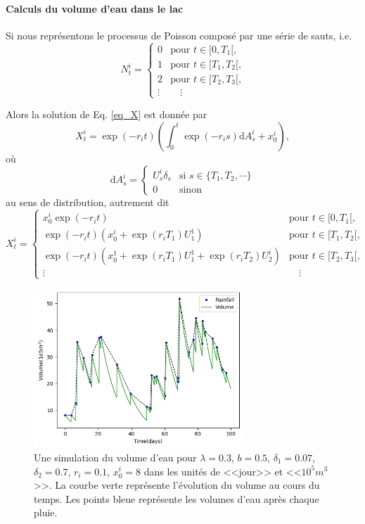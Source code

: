 \documentclass{article}
\def \dd {\mathrm{d}}
\begin{document}
\paragraph{Calculs du volume d'eau dans le lac} Si nous représentons le processus de Poisson composé par une série de sauts, i.e.
\[N_t^i = \begin{cases}0&\textrm{pour $t\in [0, T_1[$,}\\
  1&\textrm{pour $t\in [T_1, T_2[$,}\\
  2&\textrm{pour $t\in [T_2, T_3[$,}\\
  \vdots &\quad\vdots\end{cases}\]

Alors la solution de Eq. \ref{eq_X} est donnée par
\[X_t^i = \exp(-r_i t)\left(\int_0^t \exp(-r_i s)\dd A_s^i + x_0^i\right),\]
où \[\dd A_s^i=\begin{cases} U_s^i\delta_s &\text{si } s\in \{T_1,T_2,\cdots\}\\
  0&\text{sinon}\end{cases}\] 
au sens de distribution, autrement dit
\[X_t^i = \begin{cases}x_0^i\exp(-r_i t)&\textrm{pour $t\in [0, T_1[$,}\\
  \exp(-r_i t)(x_0^i+\exp(r_i T_1)U_1^1)&\textrm{pour $t\in [T_1, T_2[$,}\\
  \exp(-r_i t)(x_0^1+\exp(r_i T_1)U_1^1+\exp(r_i T_2)U_2^i)&\textrm{pour $t\in [T_2, T_3[$,}\\
  \vdots &\quad\vdots\end{cases}\]

\begin{figure}[t]
  \centering
  \includegraphics[width=0.7\textwidth]{rainfall.png}
  \caption{Une simulation du volume d'eau pour $\lambda=0.3$, $b=0.5$, $\delta_1=0.07$, $\delta_2=0.7$, $r_i=0.1$, $x_0^i=8$ dans les unités de <<jour>> et <<$10^5m^3$>>. La courbe verte représente l'évolution du volume au cours du temps. Les points bleue représente les volumes d'eau après chaque pluie.}
  \label{v_e}
\end{figure}
\end{document}

